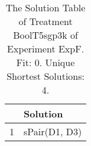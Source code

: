 \begin{table}[ht]
\centering
\begin{tabular}{rp{9cm}}
  \hline
 & Solution \\ 
  \hline
1 & sPair(D1, D3) \\ 
   \hline
\end{tabular}
\caption{The Solution Table of Treatment BoolT5sgp3k of Experiment ExpF. Fit: 0. Unique Shortest Solutions: 4.} 
\end{table}
